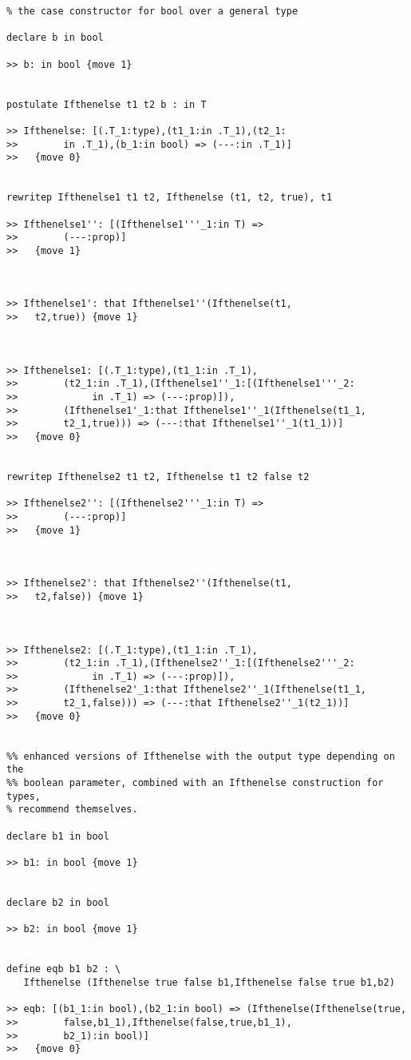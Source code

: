 \documentclass[12pt]{article}
\begin{document}
\begin{verbatim}
% the case constructor for bool over a general type

declare b in bool

>> b: in bool {move 1}


postulate Ifthenelse t1 t2 b : in T

>> Ifthenelse: [(.T_1:type),(t1_1:in .T_1),(t2_1:
>>        in .T_1),(b_1:in bool) => (---:in .T_1)]
>>   {move 0}


rewritep Ifthenelse1 t1 t2, Ifthenelse (t1, t2, true), t1

>> Ifthenelse1'': [(Ifthenelse1'''_1:in T) => 
>>        (---:prop)]
>>   {move 1}



>> Ifthenelse1': that Ifthenelse1''(Ifthenelse(t1,
>>   t2,true)) {move 1}



>> Ifthenelse1: [(.T_1:type),(t1_1:in .T_1),
>>        (t2_1:in .T_1),(Ifthenelse1''_1:[(Ifthenelse1'''_2:
>>             in .T_1) => (---:prop)]),
>>        (Ifthenelse1'_1:that Ifthenelse1''_1(Ifthenelse(t1_1,
>>        t2_1,true))) => (---:that Ifthenelse1''_1(t1_1))]
>>   {move 0}


rewritep Ifthenelse2 t1 t2, Ifthenelse t1 t2 false t2

>> Ifthenelse2'': [(Ifthenelse2'''_1:in T) => 
>>        (---:prop)]
>>   {move 1}



>> Ifthenelse2': that Ifthenelse2''(Ifthenelse(t1,
>>   t2,false)) {move 1}



>> Ifthenelse2: [(.T_1:type),(t1_1:in .T_1),
>>        (t2_1:in .T_1),(Ifthenelse2''_1:[(Ifthenelse2'''_2:
>>             in .T_1) => (---:prop)]),
>>        (Ifthenelse2'_1:that Ifthenelse2''_1(Ifthenelse(t1_1,
>>        t2_1,false))) => (---:that Ifthenelse2''_1(t2_1))]
>>   {move 0}


%% enhanced versions of Ifthenelse with the output type depending on the
%% boolean parameter, combined with an Ifthenelse construction for types,
% recommend themselves.

declare b1 in bool

>> b1: in bool {move 1}


declare b2 in bool

>> b2: in bool {move 1}


define eqb b1 b2 : \
   Ifthenelse (Ifthenelse true false b1,Ifthenelse false true b1,b2)

>> eqb: [(b1_1:in bool),(b2_1:in bool) => (Ifthenelse(Ifthenelse(true,
>>        false,b1_1),Ifthenelse(false,true,b1_1),
>>        b2_1):in bool)]
>>   {move 0}



\end{verbatim}
\end{document}
